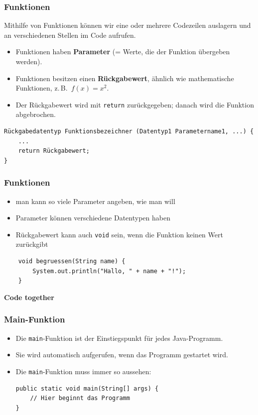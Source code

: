 \documentclass{../../presentation}
\begin{document}
\begin{frame}[fragile]
    \frametitle{Funktionen}
    Mithilfe von Funktionen können wir eine oder mehrere Codezeilen auslagern und an verschiedenen Stellen im Code aufrufen.
    \begin{itemize}
        \item Funktionen haben \textbf{Parameter} (= Werte, die der Funktion übergeben werden).
        \item Funktionen besitzen einen \textbf{Rückgabewert}, ähnlich wie mathematische Funktionen, z.\,B.\ $f(x) = x^2$.
        \item Der Rückgabewert wird mit \texttt{return} zurückgegeben; danach wird die Funktion abgebrochen.
    \end{itemize}
    \begin{verbatim}
Rückgabedatentyp Funktionsbezeichner (Datentyp1 Parametername1, ...) {
    ...
    return Rückgabewert;
}
\end{verbatim}
\end{frame}

\begin{frame}[fragile]
    \frametitle{Funktionen}
    \begin{itemize}
        \item man kann so viele Parameter angeben, wie man will
        \item Parameter können verschiedene Datentypen haben
        \item Rückgabewert kann auch \texttt{void} sein, wenn die Funktion keinen Wert zurückgibt
    \end{itemize}
    \begin{verbatim}
    void begruessen(String name) {
        System.out.println("Hallo, " + name + "!");
    }
    \end{verbatim}
\end{frame}

\begin{frame}[plain]
    \centering
    {\Huge\bfseries{Code together}}
\end{frame}

\begin{frame}[fragile]
    \frametitle{Main-Funktion}
    \begin{itemize}
        \item Die \texttt{main}-Funktion ist der Einstiegspunkt für jedes Java-Programm.
        \item Sie wird automatisch aufgerufen, wenn das Programm gestartet wird.
        \item Die \texttt{main}-Funktion muss immer so aussehen:
              \begin{verbatim}
public static void main(String[] args) {
    // Hier beginnt das Programm
}
\end{verbatim}
    \end{itemize}
\end{frame}
\end{document}
